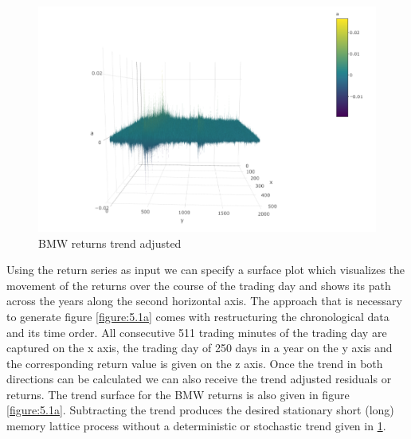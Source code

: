 \documentclass[12pt]{article}
\begin{document}
\begin{figure}[ht] 
	\centering
	\includegraphics[width=1\textwidth]{BMW_Returns_lattice5.png}
	\caption{BMW returns trend adjusted}
	\label{figure:5.1aa}
\end{figure}
Using the return series as input we can specify a surface plot which visualizes the movement of the returns over the course of the trading day 
and shows its path across the years along the second horizontal axis. The approach that is necessary to generate figure \ref{figure:5.1a} comes with restructuring the chronological data and its time order. All consecutive 511 trading minutes of the trading day are captured on the x axis, the trading day of 250 days in a year on the y axis and the corresponding return value is given on the z axis. Once the trend in both directions can be calculated we can also receive the trend adjusted residuals or returns. The trend surface for the BMW returns is also given in figure \ref{figure:5.1a}. Subtracting the trend produces the desired stationary short (long) memory lattice process without a deterministic or stochastic trend given in \ref{figure:5.1aa}. 
\end{document}
